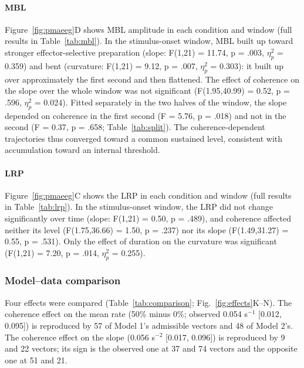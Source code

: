 \documentclass[a4paper,11pt]{article}
\theoremstyle{definition}
\newcommand{\1}{\mathbbm{1}}
\begin{document}
\paragraph{MBL}

Figure~\ref{fig:pmaeeg}D shows MBL amplitude in each condition and window (full results in Table~\ref{tab:mbl}). In the stimulus-onset window, MBL built up toward stronger effector-selective preparation (slope: F(1,21) = 11.74, p = .003, $\eta_{p}^{2}$ = 0.359) and bent (curvature: F(1,21) = 9.12, p = .007, $\eta_{p}^{2}$ = 0.303): it built up over approximately the first second and then flattened. The effect of coherence on the slope over the whole window was not significant (F(1.95,40.99) = 0.52, p = .596, $\eta_{p}^{2}$ = 0.024). Fitted separately in the two halves of the window, the slope depended on coherence in the first second (F = 5.76, p = .018) and not in the second (F = 0.37, p = .658; Table~\ref{tab:split}). The coherence-dependent trajectories thus converged toward a common sustained level, consistent with accumulation toward an internal threshold.

\paragraph{LRP}

Figure~\ref{fig:pmaeeg}C shows the LRP in each condition and window (full results in Table~\ref{tab:lrp}). In the stimulus-onset window, the LRP did not change significantly over time (slope: F(1,21) = 0.50, p = .489), and coherence affected neither its level (F(1.75,36.66) = 1.50, p = .237) nor its slope (F(1.49,31.27) = 0.55, p = .531). Only the effect of duration on the curvature was significant (F(1,21) = 7.20, p = .014, $\eta_{p}^{2}$ = 0.255).


\subsubsection{Model--data comparison}

Four effects were compared (Table~\ref{tab:comparison}; Fig.~\ref{fig:effects}K--N). The coherence effect on the mean rate (50\% minus 0\%; observed 0.054 s$^{-1}$ [0.012, 0.095]) is reproduced by 57 of Model 1's admissible vectors and 48 of Model 2's. The coherence effect on the slope (0.056 s$^{-2}$ [0.017, 0.096]) is reproduced by 9 and 22 vectors; its sign is the observed one at 37 and 74 vectors and the opposite one at 51 and 21.
\end{document}
